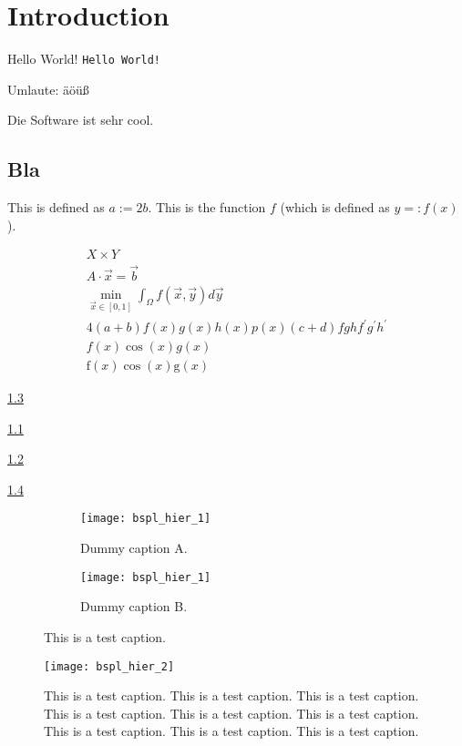 
\chapter{Introduction}

\cite{zenger91}

Hello World! \texttt{Hello World!}

\nocite{*}

Umlaute: äöüß

Die Software \sgpp ist sehr cool.

\section{Bla}

This is defined as $a := 2b$.
This is the function $f$ (which is defined as $y =: f(x)$).

\begin{gather}
  X \times Y\\
  A \cdot \vec{x} = \vec{b}\\
  \min_{\vec{x} \in [0, 1]} \int_\Omega f(\vec{x}, \vec{y}) d\vec{y}\\
  4(a+b)f(x)g(x)h(x)p(x)(c+d)fghf^\prime g^\prime h^\prime\\
  f(x)\cos(x)g(x)\\
  \mathrm{f}(x)\cos(x)\mathrm{g}(x)
\end{gather}

\cref{fig:1}

\cref{fig:1a}

\cref{fig:1b}

\cref{fig:2}

\begin{figure}
  \begin{subfigure}{60mm}
    \texttt{[image: bspl\_hier\_1]}
    \caption{Dummy caption A.}
    \label{fig:1a}
  \end{subfigure}
  \begin{subfigure}{60mm}
    \texttt{[image: bspl\_hier\_1]}
    \caption{Dummy caption B.}
    \label{fig:1b}
  \end{subfigure}
  \caption{This is a test caption.}
  \label{fig:1}
\end{figure}

\begin{figure}
  \texttt{[image: bspl\_hier\_2]}
  \caption{%
    This is a test caption.
    This is a test caption.
    This is a test caption.
    This is a test caption.
    This is a test caption.
    This is a test caption.
    This is a test caption.
    This is a test caption.
    This is a test caption.%
  }
  \label{fig:2}
\end{figure}

\blindmathpaper
